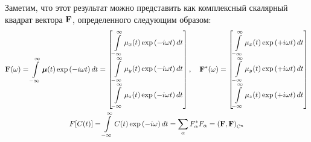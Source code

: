 Заметим, что этот результат можно представить как комплексный скалярный квадрат вектора $\mathbf{F}$, определенного следующим образом:
\vverh
\begin{gather}
	\mathbf{F}(\omega) = \int\limits_{-\infty}^{\infty} \boldsymbol{\mu}(t) \exp \left( - i \omega t \right) dt = 
\begin{bmatrix}
	{\displaystyle \int\limits_{-\infty}^{\infty}\mu_x(t) \exp \left(- i \omega t \right)dt} \\
	{\displaystyle \int\limits_{-\infty}^{\infty} \mu_y(t) \exp \left( - i \omega t \right) dt} \\
	{\displaystyle \int\limits_{-\infty}^{\infty} \mu_z(t) \exp \left( - i \omega t \right) dt} 
\end{bmatrix}, \quad
\mathbf{F}^{*}(\omega) =
\begin{bmatrix}
	{\displaystyle \int\limits_{-\infty}^{\infty}\mu_x(t) \exp \left(+ i \omega t \right)dt} \\
	{\displaystyle \int\limits_{-\infty}^{\infty} \mu_y(t) \exp \left( + i \omega t \right) dt} \\
	{\displaystyle \int\limits_{-\infty}^{\infty} \mu_z(t) \exp \left( + i \omega t \right) dt}
\end{bmatrix} \notag \\
F[C(t)] = \int\limits_{-\infty}^{\infty} C(t) \exp \left( - i \omega \right) dt = \sum_{\alpha} F_\alpha^{*} F_\alpha = \left( \mathbf{F}, \mathbf{F} \right)_{\mathbb{C}^n} \notag
\end{gather}

